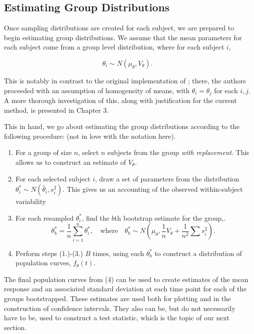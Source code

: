 \subsection{Estimating Group Distributions}\label{sec:group_dist}

Once sampling distributions are created for each subject, we are prepared to begin estimating group distributions. We assume that the mean parameters for each subject come from a group level distribution, where for each subject $i$,

\begin{equation}
\theta_i \sim N(\mu_{\theta}, V_{\theta}).
\end{equation}

This is notably in contrast to the original implementation of ; there, the authors proceeded with an assumption of homogeneity of means, with $\theta_i = \theta_j$ for each $i, j$. A more thorough investigation of this, along with justification for the current method, is presented in Chapter 3.

This in hand, we go about estimating the group distributions according to the following procedure: (not in love with the notation here).

\begin{singlespace}
\begin{enumerate}
\vspace{-3mm}
\item For a group of size $n$, select $n$ subjects from the group \textit{with replacement}. This allows us to construct an estimate of $V_{\theta}$.
\item For each selected subject $i$, draw a set of parameters from the distribution $\theta_{i}^* \sim N(\hat{\theta}_i, s_i^2)$. This gives us an accounting of the observed within-subject variability
\item For each resampled $\theta_i^*$, find the $b$th bootstrap estimate for the group,.
\begin{equation}
\theta_b^* = \frac1n \sum_{i=1}^n \theta_i^*, \quad \text{where} \quad \theta_b^* \sim N  \left(\mu_{\theta}, \frac1n V_{\theta} + \frac{1}{n^2}\sum s_i^2 \right).
\end{equation}
\item Perform steps (1.)-(3.) $B$ times, using each $\theta_b^*$ to construct a distribution of population curves, $f_{\theta}(t)$.
\end{enumerate}
\end{singlespace}

The final population curves from (4) can be used to create estimates of the mean response and an associated standard deviation at each time point for each of the groups bootstrapped. These estimates are used both for plotting and in the construction of confidence intervals. They also can be, but do not necessarily have to be, used to construct a test statistic, which is the topic of our next section.

